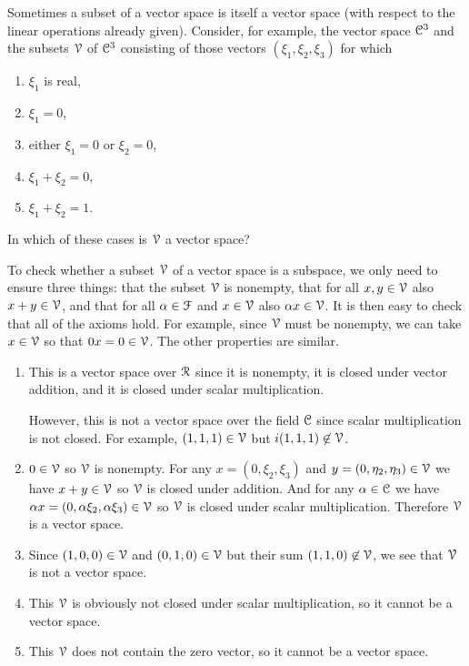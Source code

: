  Sometimes a subset of a vector space is itself a vector
space (with respect to the linear operations already given). Consider,
for example, the vector space $\mathcal{C}^3$ and the subsets $\mathcal{V}$ of $\mathcal{C}^3$
consisting of those vectors $(\xi_1, \xi_2, \xi_3)$ for which
\begin{enumerate}
\item $\xi_1$ is real,
\item $\xi_1 = 0$,
\item either $\xi_1 = 0$ or $\xi_2 = 0$,
\item $\xi_1 + \xi_2 = 0$,
\item $\xi_1 + \xi_2 = 1$.
\end{enumerate}
In which of these cases is $\mathcal{V}$ a vector space?
\begin{solution}
  To check whether a subset $\mathcal{V}$ of a vector space is a subspace, we
  only need to ensure three things: that the subset $\mathcal{V}$ is nonempty,
  that for all $x,y\in\mathcal{V}$ also $x + y\in\mathcal{V}$, and that for all
  $\alpha\in\mathcal{F}$ and $x\in\mathcal{V}$ also $\alpha x\in\mathcal{V}$. It is then easy to
  check that all of the axioms hold. For example, since $\mathcal{V}$ must be
  nonempty, we can take $x\in\mathcal{V}$ so that $0x = 0\in\mathcal{V}$. The other
  properties are similar.
  \begin{enumerate}
  \item This is a vector space over $\mathcal{R}$ since it is nonempty, it is
    closed under vector addition, and it is closed under scalar
    multiplication.

    However, this is not a vector space over the field $\mathcal{C}$ since
    scalar multiplication is not closed. For example, $(1,1,1)\in\mathcal{V}$
    but $i(1, 1, 1)\not\in\mathcal{V}$.
  \item $0\in\mathcal{V}$ so $\mathcal{V}$ is nonempty. For any $x = (0,\xi_2,\xi_3)$
    and $y = (0,\eta_2,\eta_3)\in\mathcal{V}$ we have $x + y\in\mathcal{V}$ so $\mathcal{V}$ is
    closed under addition. And for any $\alpha\in\mathcal{C}$ we have
    $\alpha x = (0, \alpha\xi_2, \alpha\xi_3)\in\mathcal{V}$ so $\mathcal{V}$ is closed
    under scalar multiplication. Therefore $\mathcal{V}$ is a vector space.
  \item Since $(1, 0, 0)\in\mathcal{V}$ and $(0, 1, 0)\in\mathcal{V}$ but their sum
    $(1, 1, 0)\not\in\mathcal{V}$, we see that $\mathcal{V}$ is not a vector space.
  \item This $\mathcal{V}$ is obviously not closed under scalar multiplication,
    so it cannot be a vector space.
  \item This $\mathcal{V}$ does not contain the zero vector, so it cannot be a
    vector space. \qedhere
  \end{enumerate}
\end{solution}

